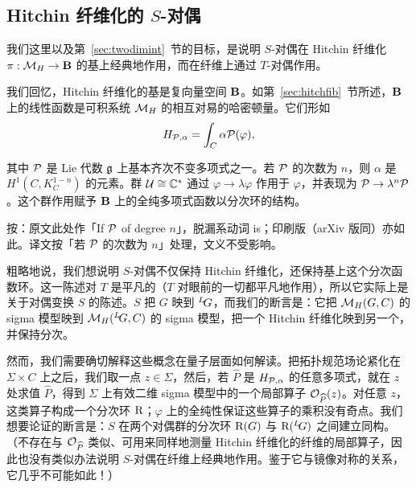 \subsection{Hitchin 纤维化的 $S$-对偶}

\label{sec:sdualhitfib}

我们这里以及第~\ref{sec:twodimint}~节的目标，是说明 $S$-对偶在 Hitchin 纤维化 $\pi:\MH\to {\EUBB}$ 的基上经典地作用，而在纤维上通过 $T$-对偶作用。

我们回忆，Hitchin 纤维化的基是复向量空间 ${\EUBB}$。如第~\ref{sec:hitchfib}~节所述，${\EUBB}$ 上的线性函数是可积系统 $\MH$ 的相互对易的哈密顿量。它们形如
\setcounter{equation}{36}
\begin{equation}\label{eq:utyr}
H_{{\cal P},\alpha}=\int_C\alpha {\cal P}(\varphi),
\end{equation}

其中 ${\cal P}$ 是 Lie 代数 $\g$ 上基本齐次不变多项式之一。若 ${\cal P}$ 的次数为 $n$，则 $\alpha$ 是 $H^1(C,K_C^{1-n})$ 的元素。群 ${\cal U}\cong \Bbb{C}^*$ 通过 $\varphi\to\lambda\varphi$ 作用于 $\varphi$，并表现为 ${\cal P}\to \lambda^n{\cal P}$。这个群作用赋予 ${\EUBB}$ 上的全纯多项式函数以分次环的结构。

\begin{yizhu}[原文疑误]
按：原文此处作「If ${\cal P}$  of degree $n$」，脱漏系动词 is；印刷版（arXiv 版同）亦如此。译文按「若 ${\cal P}$ 的次数为 $n$」处理，文义不受影响。
\end{yizhu}

粗略地说，我们想说明 $S$-对偶不仅保持 Hitchin 纤维化，还保持基上这个分次函数环。这一陈述对 $T$ 是平凡的（$T$ 对眼前的一切都平凡地作用），所以它实际上是关于对偶变换 $S$ 的陈述。$S$ 把 $G$ 映到 $^L\negthinspace G$，而我们的断言是：它把 $\MH(G,C)$ 的 sigma 模型映到 $\MH(^L\negthinspace G,C)$ 的 sigma 模型，把一个 Hitchin 纤维化映到另一个，并保持分次。

然而，我们需要确切解释这些概念在量子层面如何解读。把拓扑规范场论紧化在 $\Sigma\times C$ 上之后，我们取一点 $z\in \Sigma$，然后，若 ${\hat P}$ 是 $H_{{\cal P},\alpha}$ 的任意多项式，就在 $z$ 处求值 ${\hat P}$，得到 $\Sigma$ 上有效二维 sigma 模型中的一个局部算子 ${\EUO}_{\hat P}(z)$。对任意 $z$，这类算子构成一个分次环 ${{\eurm R}}$；$\varphi$ 上的全纯性保证这些算子的乘积没有奇点。我们想要论证的断言是：$S$ 在两个对偶群的分次环 ${{\eurm R}}(G)$ 与 ${{\eurm R}}(^L\negthinspace G)$ 之间建立同构。（不存在与 ${\EUO}_{\hat P}$ 类似、可用来同样地测量 Hitchin 纤维化的纤维的局部算子，因此也没有类似办法说明 $S$-对偶在纤维上经典地作用。鉴于它与镜像对称的关系，它几乎不可能如此！）


